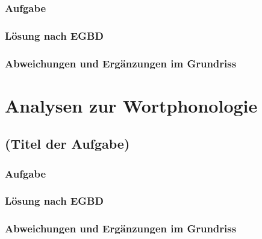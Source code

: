 \subsubsection{Aufgabe}

\subsubsection{Lösung nach EGBD}

\subsubsection{Abweichungen und Ergänzungen im Grundriss}


\section{Analysen zur Wortphonologie}
\label{sec:phonologie:analysenzurwortphonologie}

\subsection{(Titel der Aufgabe)}

\subsubsection{Aufgabe}

\subsubsection{Lösung nach EGBD}

\subsubsection{Abweichungen und Ergänzungen im Grundriss}
